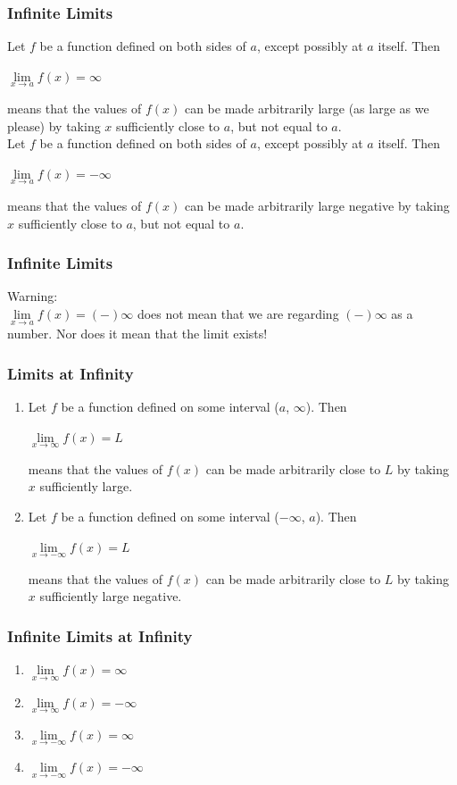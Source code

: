 \begin{frame}

	\frametitle{Infinite Limits}
	Let $f$ be a function defined on both sides of $a$, \alert{except possibly} at $a$ itself. Then
	\begin{center}
		$\lim\limits_{\textit{x} \to a}f(x) = \infty$
	\end{center}
	means that the values of $f(x)$ can be made arbitrarily large (as large as we please) by taking $x$ \alert{sufficiently close to} $a$, but \alert{not equal to} $a$.\\

	Let $f$ be a function defined on both sides of $a$, \alert{except possibly} at $a$ itself. Then
	\begin{center}
		$\lim\limits_{\textit{x} \to a}f(x) = -\infty$
	\end{center}
	means that the values of $f(x)$ can be made arbitrarily large negative by taking $x$ \alert{sufficiently close to} $a$, but \alert{not equal to} $a$.
\end{frame}
\begin{frame}
	\frametitle{Infinite Limits}
	\alert{Warning:}\\
	$\lim\limits_{\textit{x} \to a}f(x) = (-)\infty$ does not mean that we are regarding $(-)\infty$ as a number. Nor does it mean that the limit exists!
\end{frame}
\begin{frame}
	\frametitle{Limits at Infinity}
	\begin{enumerate}
		\item Let $f$ be a function defined on some interval ($a$, $\infty$). Then
		      \begin{center}
			      $\lim\limits_{\textit{x} \to \infty}f(x) = L$
		      \end{center}
		      means that the values of $f(x)$ can be made arbitrarily close to $L$ by taking $x$ sufficiently large.
		\item Let $f$ be a function defined on some interval ($-\infty$, $a$). Then
		      \begin{center}
			      $\lim\limits_{\textit{x} \to -\infty}f(x) = L$
		      \end{center}
		      means that the values of $f(x)$ can be made arbitrarily close to $L$ by taking $x$ sufficiently large negative.
	\end{enumerate}
\end{frame}
\begin{frame}
	\frametitle{Infinite Limits at Infinity}
	\begin{enumerate}
		\item $\lim\limits_{\textit{x} \to \infty}f(x) = \infty$
		\item $\lim\limits_{\textit{x} \to \infty}f(x) = -\infty$
		\item $\lim\limits_{\textit{x} \to -\infty}f(x) = \infty$
		\item $\lim\limits_{\textit{x} \to -\infty}f(x) = -\infty$
	\end{enumerate}
\end{frame}
